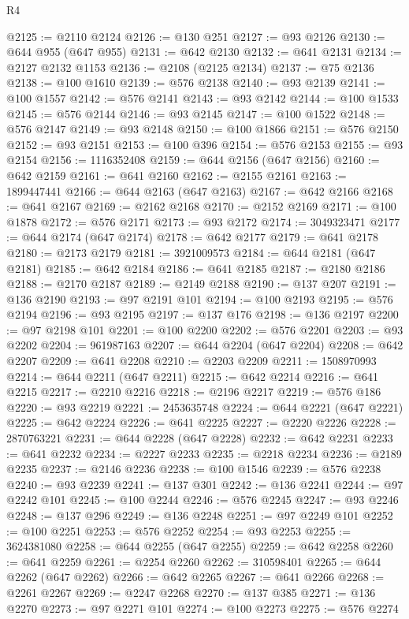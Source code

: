 \begin{lexlean}{R4}
\begin{coremodule}
@2125 := @2110 @2124
@2126 := @130 @251
@2127 := @93 @2126
@2130 := @644 @955 (@647 @955)
@2131 := @642 @2130
@2132 := @641 @2131
@2134 := @2127 @2132 @1153
@2136 := @2108 (@2125 @2134)
@2137 := @75 @2136
@2138 := @100 @1610
@2139 := @576 @2138
@2140 := @93 @2139
@2141 := @100 @1557
@2142 := @576 @2141
@2143 := @93 @2142
@2144 := @100 @1533
@2145 := @576 @2144
@2146 := @93 @2145
@2147 := @100 @1522
@2148 := @576 @2147
@2149 := @93 @2148
@2150 := @100 @1866
@2151 := @576 @2150
@2152 := @93 @2151
@2153 := @100 @396
@2154 := @576 @2153
@2155 := @93 @2154
@2156 := 1116352408
@2159 := @644 @2156 (@647 @2156)
@2160 := @642 @2159
@2161 := @641 @2160
@2162 := @2155 @2161
@2163 := 1899447441
@2166 := @644 @2163 (@647 @2163)
@2167 := @642 @2166
@2168 := @641 @2167
@2169 := @2162 @2168
@2170 := @2152 @2169
@2171 := @100 @1878
@2172 := @576 @2171
@2173 := @93 @2172
@2174 := 3049323471
@2177 := @644 @2174 (@647 @2174)
@2178 := @642 @2177
@2179 := @641 @2178
@2180 := @2173 @2179
@2181 := 3921009573
@2184 := @644 @2181 (@647 @2181)
@2185 := @642 @2184
@2186 := @641 @2185
@2187 := @2180 @2186
@2188 := @2170 @2187
@2189 := @2149 @2188
@2190 := @137 @207
@2191 := @136 @2190
@2193 := @97 @2191 @101
@2194 := @100 @2193
@2195 := @576 @2194
@2196 := @93 @2195
@2197 := @137 @176
@2198 := @136 @2197
@2200 := @97 @2198 @101
@2201 := @100 @2200
@2202 := @576 @2201
@2203 := @93 @2202
@2204 := 961987163
@2207 := @644 @2204 (@647 @2204)
@2208 := @642 @2207
@2209 := @641 @2208
@2210 := @2203 @2209
@2211 := 1508970993
@2214 := @644 @2211 (@647 @2211)
@2215 := @642 @2214
@2216 := @641 @2215
@2217 := @2210 @2216
@2218 := @2196 @2217
@2219 := @576 @186
@2220 := @93 @2219
@2221 := 2453635748
@2224 := @644 @2221 (@647 @2221)
@2225 := @642 @2224
@2226 := @641 @2225
@2227 := @2220 @2226
@2228 := 2870763221
@2231 := @644 @2228 (@647 @2228)
@2232 := @642 @2231
@2233 := @641 @2232
@2234 := @2227 @2233
@2235 := @2218 @2234
@2236 := @2189 @2235
@2237 := @2146 @2236
@2238 := @100 @1546
@2239 := @576 @2238
@2240 := @93 @2239
@2241 := @137 @301
@2242 := @136 @2241
@2244 := @97 @2242 @101
@2245 := @100 @2244
@2246 := @576 @2245
@2247 := @93 @2246
@2248 := @137 @296
@2249 := @136 @2248
@2251 := @97 @2249 @101
@2252 := @100 @2251
@2253 := @576 @2252
@2254 := @93 @2253
@2255 := 3624381080
@2258 := @644 @2255 (@647 @2255)
@2259 := @642 @2258
@2260 := @641 @2259
@2261 := @2254 @2260
@2262 := 310598401
@2265 := @644 @2262 (@647 @2262)
@2266 := @642 @2265
@2267 := @641 @2266
@2268 := @2261 @2267
@2269 := @2247 @2268
@2270 := @137 @385
@2271 := @136 @2270
@2273 := @97 @2271 @101
@2274 := @100 @2273
@2275 := @576 @2274

\end{coremodule}
\end{lexlean}
